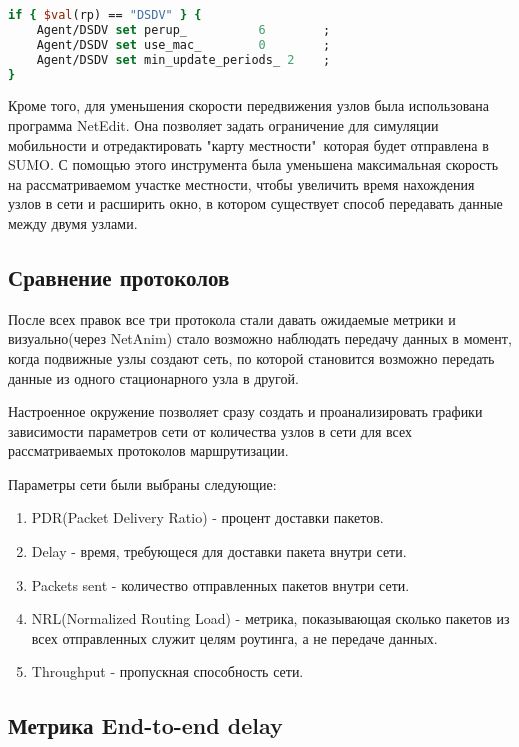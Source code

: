 \begin{lstlisting}[language=tcl, style=mystyle, caption=Дополнительные настройки для Agent/DSDV]
if { $val(rp) == "DSDV" } {
    Agent/DSDV set perup_          6        ;
    Agent/DSDV set use_mac_        0        ;
    Agent/DSDV set min_update_periods_ 2    ;
}
\end{lstlisting}

Кроме того, для уменьшения скорости передвижения узлов была использована программа NetEdit. Она позволяет задать ограничение для симуляции мобильности и отредактировать "карту местности"\, которая будет отправлена в SUMO. С помощью этого инструмента была уменьшена максимальная скорость на рассматриваемом участке местности, чтобы увеличить время нахождения узлов в сети и расширить окно, в котором существует способ передавать данные между двумя узлами.

\subsection*{Сравнение протоколов}

После всех правок все три протокола стали давать ожидаемые метрики и визуально(через NetAnim) стало возможно наблюдать передачу данных в момент, когда подвижные узлы создают сеть, по которой становится возможно передать данные из одного стационарного узла в другой.

Настроенное окружение позволяет сразу создать и проанализировать графики зависимости параметров сети от количества узлов в сети для всех рассматриваемых протоколов маршрутизации.

Параметры сети были выбраны следующие: 

\begin{enumerate}
    \item PDR(Packet Delivery Ratio) - процент доставки пакетов.
    \item Delay - время, требующеся для доставки пакета внутри сети.
    \item Packets sent - количество отправленных пакетов внутри сети.
    \item NRL(Normalized Routing Load) - метрика, показывающая сколько пакетов из всех отправленных служит целям роутинга, а не передаче данных.
    \item Throughput - пропускная способность сети.
\end{enumerate}

\subsection*{Метрика End-to-end delay}

